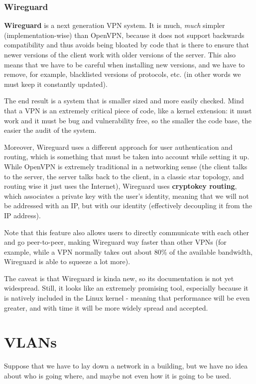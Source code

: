 
\subsubsection*{Wireguard}
\textbf{Wireguard} is a next generation VPN system. It is much, \textit{much} simpler (implementation-wise) than OpenVPN, because it does not support backwards compatibility and thus avoids being bloated by code that is there to ensure that newer versions of the client work with older versions of the server. This also means that we have to be careful when installing new versions, and we have to remove, for example, blacklisted versions of protocols, etc. (in other words we must keep it constantly updated).

The end result is a system that is smaller sized and more easily checked. Mind that a VPN is an extremely critical piece of code, like a kernel extension: it must work and it must be bug and vulnerability free, so the smaller the code base, the easier the audit of the system.

Moreover, Wireguard uses a different approach for user authentication and routing, which is something that must be taken into account while setting it up. While OpenVPN is extremely traditional in a networking sense (the client talks to the server, the server talks back to the client, in a classic star topology, and routing wise it just uses the Internet), Wireguard uses \textbf{cryptokey routing}, which associates a private key with the user's identity, meaning that we will not be addressed with an IP, but with our identity (effectively decoupling it from the IP address).

Note that this feature also allows users to directly communicate with each other and go peer-to-peer, making Wireguard way faster than other VPNs (for example, while a VPN normally takes out about 80\% of the available bandwidth, Wireguard is able to squeeze a lot more).

The caveat is that Wireguard is kinda new, so its documentation is not yet widespread. Still, it looks like an extremely promising tool, especially because it is natively included in the Linux kernel - meaning that performance will be even greater, and with time it will be more widely spread and accepted.


\section{VLANs}
Suppose that we have to lay down a network in a building, but we have no idea about who is going where, and maybe not even how it is going to be used.

